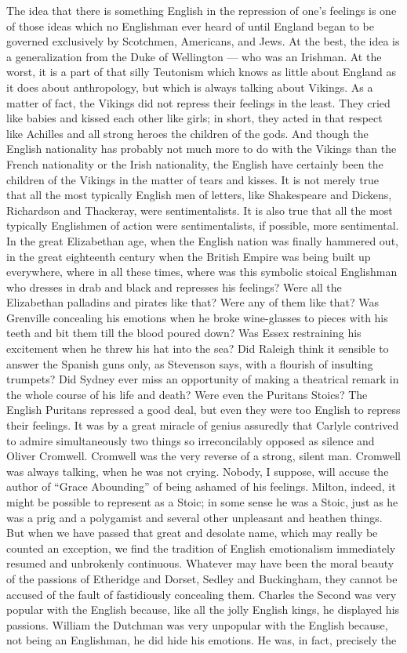 The idea that there is something English in the repression of one’s feelings is one of those ideas which no Englishman ever heard of until England began to be governed exclusively by Scotchmen, Americans, and Jews. At the best, the idea is a generalization from the Duke of Wellington — who was an Irishman. At the worst, it is a part of that silly Teutonism which knows as little about England as it does about anthropology, but which is always talking about Vikings. As a matter of fact, the Vikings did not repress their feelings in the least. They cried like babies and kissed each other like girls; in short, they acted in that respect like Achilles and all strong heroes the children of the gods. And though the English nationality has probably not much more to do with the Vikings than the French nationality or the Irish nationality, the English have certainly been the children of the Vikings in the matter of tears and kisses. It is not merely true that all the most typically English men of letters, like Shakespeare and Dickens, Richardson and Thackeray, were sentimentalists. It is also true that all the most typically Englishmen of action were sentimentalists, if possible, more sentimental. In the great Elizabethan age, when the English nation was finally hammered out, in the great eighteenth century when the British Empire was being built up everywhere, where in all these times, where was this symbolic stoical Englishman who dresses in drab and black and represses his feelings? Were all the Elizabethan palladins and pirates like that? Were any of them like that? Was Grenville concealing his emotions when he broke wine-glasses to pieces with his teeth and bit them till the blood poured down? Was Essex restraining his excitement when he threw his hat into the sea? Did Raleigh think it sensible to answer the Spanish guns only, as Stevenson says, with a flourish of insulting trumpets? Did Sydney ever miss an opportunity of making a theatrical remark in the whole course of his life and death? Were even the Puritans Stoics? The English Puritans repressed a good deal, but even they were too English to repress their feelings. It was by a great miracle of genius assuredly that Carlyle contrived to admire simultaneously two things so irreconcilably opposed as silence and Oliver Cromwell. Cromwell was the very reverse of a strong, silent man. Cromwell was always talking, when he was not crying. Nobody, I suppose, will accuse the author of “Grace Abounding” of being ashamed of his feelings. Milton, indeed, it might be possible to represent as a Stoic; in some sense he was a Stoic, just as he was a prig and a polygamist and several other unpleasant and heathen things. But when we have passed that great and desolate name, which may really be counted an exception, we find the tradition of English emotionalism immediately resumed and unbrokenly continuous. Whatever may have been the moral beauty of the passions of Etheridge and Dorset, Sedley and Buckingham, they cannot be accused of the fault of fastidiously concealing them. Charles the Second was very popular with the English because, like all the jolly English kings, he displayed his passions. William the Dutchman was very unpopular with the English because, not being an Englishman, he did hide his emotions. He was, in fact, precisely the 